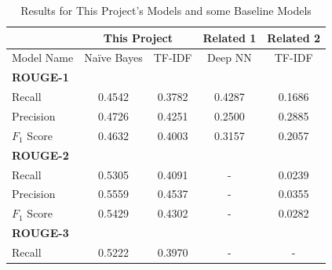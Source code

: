 \documentclass{IEEEtran}
\begin{document}
\begin{table}[h]
\raggedleft
\caption{Results for This Project's Models and some Baseline Models}
\begin{tabular}{|lcccc|}
\hline
\multicolumn{1}{|l|}{}              & \multicolumn{2}{c|}{This Project}                                 & \multicolumn{1}{c|}{Related 1}    & Related 2 \\ \hline
\multicolumn{1}{|l|}{Model Name}    & \multicolumn{1}{c|}{Na\"{i}ve Bayes} & \multicolumn{1}{c|}{TF-IDF}    & \multicolumn{1}{c|}{Deep NN} & TF-IDF         \\ \hline
\multicolumn{5}{|l|}{\textbf{ROUGE-1}}                                                                                                                            \\ \hline
\multicolumn{1}{|l|}{Recall}        & \multicolumn{1}{c|}{0.4542}      & \multicolumn{1}{c|}{0.3782}    & \multicolumn{1}{c|}{0.4287}            & 0.1686         \\ \hline
\multicolumn{1}{|l|}{Precision}     & \multicolumn{1}{c|}{0.4726}      & \multicolumn{1}{c|}{0.4251}    & \multicolumn{1}{c|}{0.2500}            & 0.2885         \\ \hline
\multicolumn{1}{|l|}{$F_1$ Score}    & \multicolumn{1}{c|}{0.4632}      & \multicolumn{1}{c|}{0.4003}    & \multicolumn{1}{c|}{0.3157}            & 0.2057         \\ \hline
\multicolumn{5}{|l|}{\textbf{ROUGE-2}}                                                                                                                            \\ \hline
\multicolumn{1}{|l|}{Recall}        & \multicolumn{1}{c|}{0.5305}      & \multicolumn{1}{c|}{0.4091}    & \multicolumn{1}{c|}{-}                 & 0.0239         \\ \hline
\multicolumn{1}{|l|}{Precision}     & \multicolumn{1}{c|}{0.5559}      & \multicolumn{1}{c|}{0.4537}    & \multicolumn{1}{c|}{-}                 & 0.0355         \\ \hline
\multicolumn{1}{|l|}{$F_1$ Score}    & \multicolumn{1}{c|}{0.5429}      & \multicolumn{1}{c|}{0.4302}    & \multicolumn{1}{c|}{-}                 & 0.0282         \\ \hline
\multicolumn{5}{|l|}{\textbf{ROUGE-3}}                                                                                                                            \\ \hline
\multicolumn{1}{|l|}{Recall}        & \multicolumn{1}{c|}{0.5222}      & \multicolumn{1}{c|}{0.3970}    & \multicolumn{1}{c|}{-}                 & -              \\ \hline

\end{tabular}
\end{table}
\end{document}
